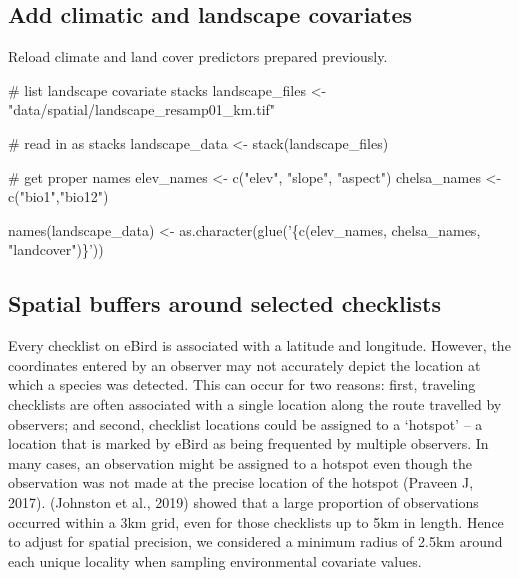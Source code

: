 \documentclass[]{article}
\newenvironment{Shaded}{}{}
\newcommand{\CommentTok}[1]{\textcolor[rgb]{0.00,0.50,0.00}{#1}}
\newcommand{\KeywordTok}[1]{\textcolor[rgb]{0.00,0.00,1.00}{#1}}
\newcommand{\NormalTok}[1]{#1}
\newcommand{\StringTok}[1]{\textcolor[rgb]{0.00,0.50,0.50}{#1}}
\begin{document}
\hypertarget{add-climatic-and-landscape-covariates}{%
\subsection{Add climatic and landscape covariates}\label{add-climatic-and-landscape-covariates}}

Reload climate and land cover predictors prepared previously.

\begin{Shaded}
\begin{Highlighting}[numbers=left,,]

\CommentTok{# list landscape covariate stacks}
\NormalTok{landscape_files <-}\StringTok{ "data/spatial/landscape_resamp01_km.tif"}

\CommentTok{# read in as stacks}
\NormalTok{landscape_data <-}\StringTok{ }\KeywordTok{stack}\NormalTok{(landscape_files)}

\CommentTok{# get proper names}
\NormalTok{elev_names <-}\StringTok{ }\KeywordTok{c}\NormalTok{(}\StringTok{"elev"}\NormalTok{, }\StringTok{"slope"}\NormalTok{, }\StringTok{"aspect"}\NormalTok{)}
\NormalTok{chelsa_names <-}\StringTok{ }\KeywordTok{c}\NormalTok{(}\StringTok{"bio1"}\NormalTok{,}\StringTok{"bio12"}\NormalTok{)}

\KeywordTok{names}\NormalTok{(landscape_data) <-}\StringTok{ }\KeywordTok{as.character}\NormalTok{(}\KeywordTok{glue}\NormalTok{(}\StringTok{'\{c(elev_names, chelsa_names, "landcover")\}'}\NormalTok{))}
\end{Highlighting}
\end{Shaded}

\hypertarget{spatial-buffers-around-selected-checklists}{%
\subsection{Spatial buffers around selected checklists}\label{spatial-buffers-around-selected-checklists}}

Every checklist on eBird is associated with a latitude and longitude. However, the coordinates entered by an observer may not accurately depict the location at which a species was detected. This can occur for two reasons: first, traveling checklists are often associated with a single location along the route travelled by observers; and second, checklist locations could be assigned to a `hotspot' -- a location that is marked by eBird as being frequented by multiple observers. In many cases, an observation might be assigned to a hotspot even though the observation was not made at the precise location of the hotspot (Praveen J, 2017). (Johnston et al., 2019) showed that a large proportion of observations occurred within a 3km grid, even for those checklists up to 5km in length. Hence to adjust for spatial precision, we considered a minimum radius of 2.5km around each unique locality when sampling environmental covariate values.
\end{document}
